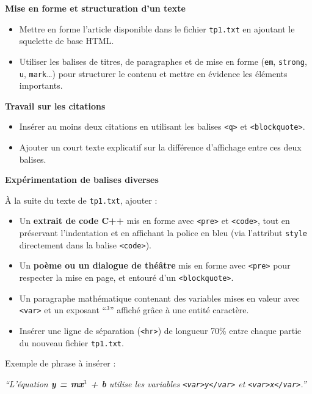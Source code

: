 \documentclass[a4paper,11pt]{article}
\begin{document}
\begin{afaire}
\textbf{Mise en forme et structuration d'un texte}

\begin{itemize}
    \item Mettre en forme l'article disponible dans le fichier \texttt{tp1.txt} en ajoutant le squelette de base HTML.
    \item Utiliser les balises de titres, de paragraphes et de mise en forme (\texttt{em}, \texttt{strong}, \texttt{u}, \texttt{mark}\ldots) pour structurer le contenu et mettre en évidence les éléments importants.
\end{itemize}

\textbf{Travail sur les citations}

\begin{itemize}
    \item Insérer au moins deux citations en utilisant les balises \texttt{<q>} et \texttt{<blockquote>}.
    \item Ajouter un court texte explicatif sur la différence d'affichage entre ces deux balises.
\end{itemize}

\textbf{Expérimentation de balises diverses}

À la suite du texte de \texttt{tp1.txt}, ajouter :

\begin{itemize}
    \item Un \textbf{extrait de code C++} mis en forme avec \texttt{<pre>} et \texttt{<code>}, tout en préservant l'indentation et en affichant la police en bleu (via l'attribut \texttt{style} directement dans la balise \texttt{<code>}).
    \item Un \textbf{poème ou un dialogue de théâtre} mis en forme avec \texttt{<pre>} pour respecter la mise en page, et entouré d'un \texttt{<blockquote>}.
    \item Un paragraphe mathématique contenant des variables mises en valeur avec \texttt{<var>} et un exposant ``$^3$'' affiché grâce à une entité caractère.
    \item Insérer une ligne de séparation (\texttt{<hr>}) de longueur 70\% entre chaque partie du nouveau fichier \texttt{tp1.txt}.
\end{itemize}

Exemple de phrase à insérer :

\textit{``L'équation \textbf{y = mx$^3$ + b} utilise les variables \texttt{<var>y</var>} et \texttt{<var>x</var>}.''}


\end{afaire}
\end{document}
